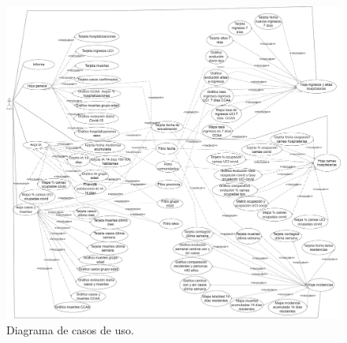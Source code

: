 \begin{figure}[h]
    \advance\leftskip-4.5cm 
    \includegraphics[scale=0.255]{img/diag2.drawio.png}
    \caption{Diagrama de casos de uso.}
\end{figure}


